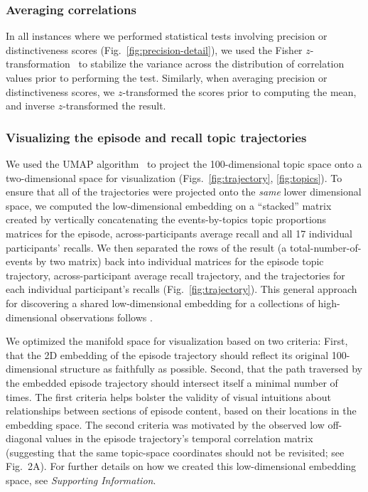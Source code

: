 \documentclass[10pt]{article}
\begin{document}
\subsubsection*{Averaging correlations}
In all instances where we performed statistical tests involving precision or distinctiveness scores (Fig.~\ref{fig:precision-detail}), we used the Fisher $z$-transformation~\citep{Fish25} to stabilize the variance across the distribution of correlation values prior to performing the test.  Similarly, when averaging precision or distinctiveness scores, we $z$-transformed the scores prior to computing the mean, and inverse $z$-transformed the result.

\subsubsection*{Visualizing the episode and recall topic trajectories}
We used the UMAP algorithm~\citep{McInEtal18} to project the 100-dimensional topic space onto a two-dimensional space for visualization (Figs.~\ref{fig:trajectory}, \ref{fig:topics}).  To ensure that all of the trajectories were projected onto the \textit{same} lower dimensional space, we computed the low-dimensional embedding on a ``stacked'' matrix created by vertically concatenating the events-by-topics topic proportions matrices for the episode, across-participants average recall and all 17 individual participants' recalls.  We then separated the rows of the result (a total-number-of-events by two matrix) back into individual matrices for the episode topic trajectory, across-participant average recall trajectory, and the trajectories for each individual participant's recalls (Fig.~\ref{fig:trajectory}).  This general approach for discovering a shared low-dimensional embedding for a collections of high-dimensional observations follows \cite{HeusEtal18a}.

We optimized the manifold space for visualization based on two criteria: First, that the 2D embedding of the episode trajectory should reflect its original 100-dimensional structure as faithfully as possible. Second, that the path traversed by the embedded episode trajectory should intersect itself a minimal number of times.  The first criteria helps bolster the validity of visual intuitions about relationships between sections of episode content, based on their locations in the embedding space.  The second criteria was motivated by the observed low off-diagonal values in the episode trajectory's temporal correlation matrix (suggesting that the same topic-space coordinates should not be revisited; see Fig.~2A). For further details on how we created this low-dimensional embedding space, see \textit{Supporting Information}.
\end{document}
